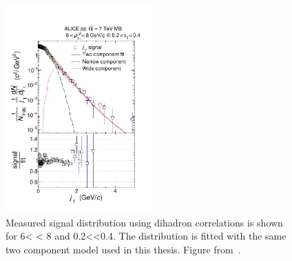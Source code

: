 \begin{figure}[htb]
\centering
\includegraphics[width = 0.5\textwidth]{figures/summary/jtsignal-89703}
\caption[Dihadron $\jt{}$ results]{Measured \jt{} signal distribution using dihadron correlations is shown for 6< < 8 and 0.2<\xlong<0.4. The distribution is fitted with the same two component model used in this thesis. Figure from~\cite{ALICEjt}.}

\label{fig:dihadron}
\end{figure}






